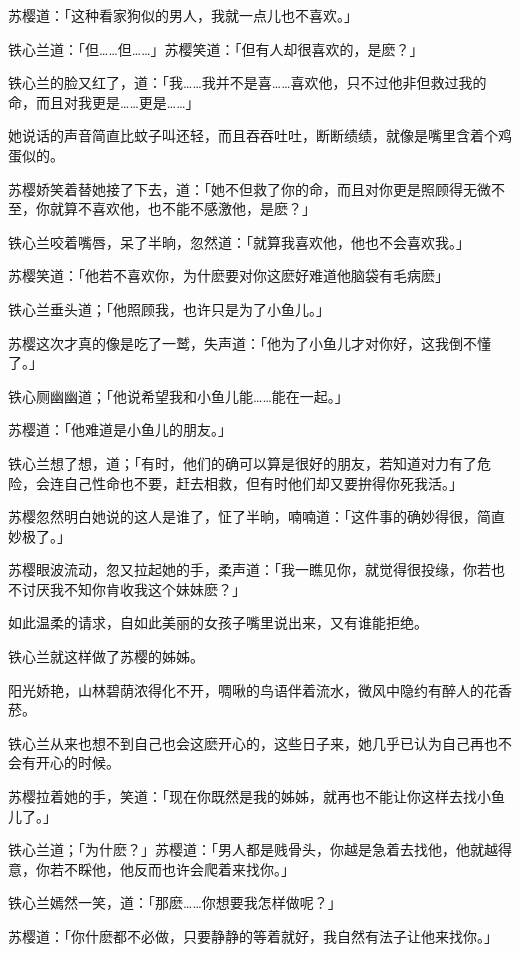 \documentclass[12pt,oneside]{book}
\begin{document}
苏樱道：「这种看家狗似的男人，我就一点儿也不喜欢。」

铁心兰道：「但\ldots\ldots 但\ldots\ldots」苏樱笑道：「但有人却很喜欢的，是麽？」

铁心兰的脸又红了，道：「我\ldots\ldots 我并不是喜\ldots\ldots 喜欢他，只不过他非但救过我的命，而且对我更是\ldots\ldots 更是\ldots\ldots」

她说话的声音简直比蚊子叫还轻，而且吞吞吐吐，断断绩绩，就像是嘴里含着个鸡蛋似的。

苏樱娇笑着替她接了下去，道：「她不但救了你的命，而且对你更是照顾得无微不至，你就算不喜欢他，也不能不感激他，是麽？」

铁心兰咬着嘴唇，呆了半晌，忽然道：「就算我喜欢他，他也不会喜欢我。」

苏樱笑道：「他若不喜欢你，为什麽要对你这麽好难道他脑袋有毛病麽」

铁心兰垂头道；「他照顾我，也许只是为了小鱼儿。」

苏樱这次才真的像是吃了一鹫，失声道：「他为了小鱼儿才对你好，这我倒不懂了。」

铁心厕幽幽道；「他说希望我和小鱼儿能\ldots\ldots 能在一起。」

苏樱道：「他难道是小鱼儿的朋友。」

铁心兰想了想，道；「有时，他们的确可以算是很好的朋友，若知道对力有了危险，会连自己性命也不要，赶去相救，但有时他们却又要拚得你死我活。」

苏樱忽然明白她说的这人是谁了，怔了半晌，喃喃道：「这件事的确妙得很，简直妙极了。」

苏樱眼波流动，忽又拉起她的手，柔声道：「我一瞧见你，就觉得很投缘，你若也不讨厌我不知你肯收我这个妹妹麽？」

如此温柔的请求，自如此美丽的女孩子嘴里说出来，又有谁能拒绝。

铁心兰就这样做了苏樱的姊姊。

阳光娇艳，山林碧荫浓得化不开，啁啾的鸟语伴着流水，微风中隐约有醉人的花香菸。

铁心兰从来也想不到自己也会这麽开心的，这些日子来，她几乎已认为自己再也不会有开心的时候。

苏樱拉着她的手，笑道：「现在你既然是我的姊姊，就再也不能让你这样去找小鱼儿了。」

铁心兰道；「为什麽？」苏樱道：「男人都是贱骨头，你越是急着去找他，他就越得意，你若不睬他，他反而也许会爬着来找你。」

铁心兰嫣然一笑，道：「那麽\ldots\ldots 你想要我怎样做呢？」

苏樱道：「你什麽都不必做，只要静静的等着就好，我自然有法子让他来找你。」
\end{document}
